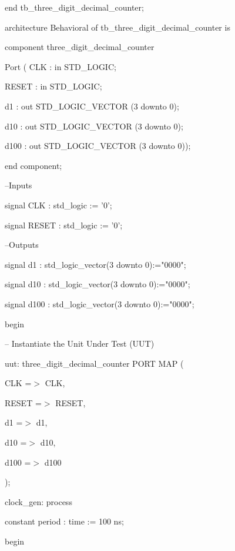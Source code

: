 \documentclass{article} %
\begin{document}
\noindent end tb\_three\_digit\_decimal\_counter;

\noindent

\noindent architecture Behavioral of tb\_three\_digit\_decimal\_counter is

\noindent     component three\_digit\_decimal\_counter

\noindent     Port ( CLK : in STD\_LOGIC;

\noindent            RESET : in STD\_LOGIC;

\noindent            d1 : out STD\_LOGIC\_VECTOR (3 downto 0);

\noindent            d10 : out STD\_LOGIC\_VECTOR (3 downto 0);

\noindent            d100 : out STD\_LOGIC\_VECTOR (3 downto 0));

\noindent     end component;

\noindent     --Inputs

\noindent     signal CLK : std\_logic := '0';

\noindent     signal RESET : std\_logic := '0';

\noindent

\noindent     --Outputs

\noindent     signal d1 : std\_logic\_vector(3 downto 0):="0000";

\noindent     signal d10 : std\_logic\_vector(3 downto 0):="0000";

\noindent     signal d100 : std\_logic\_vector(3 downto 0):="0000";

\noindent

\noindent begin

\noindent     -- Instantiate the Unit Under Test (UUT)

\noindent     uut: three\_digit\_decimal\_counter PORT MAP (

\noindent         CLK =$\mathrm{>}$ CLK,

\noindent         RESET =$\mathrm{>}$ RESET,

\noindent         d1 =$\mathrm{>}$ d1,

\noindent         d10 =$\mathrm{>}$ d10,

\noindent         d100 =$\mathrm{>}$ d100

\noindent     );

\noindent

\noindent     clock\_gen: process

\noindent     constant period : time := 100 ns;

\noindent     begin
\end{document}
